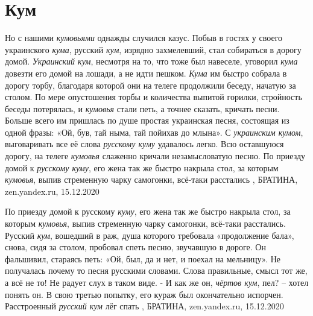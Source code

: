  
 
 
 
 
\chapter{Кум}

Но с нашими \emph{кумовьями} однажды случился казус. Побыв в гостях у своего
украинского \emph{кума}, русский \emph{кум}, изрядно захмелевший, стал
собираться в дорогу домой. \emph{Украинский кум}, несмотря на то, что тоже был
навеселе, уговорил \emph{кума} довезти его домой на лошади, а не идти пешком.
\emph{Кума} им быстро собрала в дорогу торбу, благодаря которой они на телеге
продолжили беседу, начатую за столом. По мере опустошения торбы и количества
выпитой горилки, стройность беседы потерялась, и \emph{кумовья} стали петь, а
точнее сказать, кричать песни. Больше всего им пришлась по душе простая
украинская песня, состоящая из одной фразы: «Ой, був, тай ныма, тай пойихав до
млына». С \emph{украинским кумом}, выговаривать все её слова \emph{русскому
куму} удавалось легко. Всю оставшуюся дорогу, на телеге \emph{кумовья} слаженно
кричали незамысловатую песню.  По приезду домой к \emph{русскому куму}, его
жена так же быстро накрыла стол, за которым \emph{кумовья}, выпив стременную
чарку самогонки, всё-таки расстались
, 
БРАТИНА, zen.yandex.ru, 15.12.2020

По приезду домой к русскому \emph{куму}, его жена так же быстро накрыла стол, за
которым \emph{кумовья}, выпив стременную чарку самогонки, всё-таки расстались. Русский
\emph{кум}, вошедший в раж, душа которого требовала «продолжение бала», снова, сидя за
столом, пробовал спеть песню, звучавшую в дороге. Он фальшивил, стараясь петь:
«Ой, был, да и нет, и поехал на мельницу». Не получалась почему то песня
русскими словами. Слова правильные, смысл тот же, а всё не то! Не радует слух в
таком виде.  - И как же он, \emph{чёртов кум}, пел? – хотел понять он.  В свою третью
попытку, его кураж был окончательно испорчен. Расстроенный \emph{русский кум} лёг
спать
, 
БРАТИНА, zen.yandex.ru, 15.12.2020


